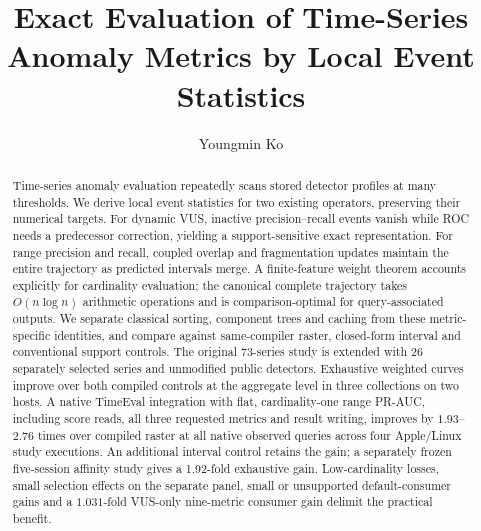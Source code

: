 \documentclass[sigconf,nonacm]{acmart}
\begin{document}
\title{Exact Evaluation of Time-Series Anomaly Metrics by Local Event Statistics}
\author{Youngmin Ko}
\begin{abstract}
Time-series anomaly evaluation repeatedly scans stored detector profiles at many thresholds. We derive local event statistics for two existing operators, preserving their numerical targets. For dynamic VUS, inactive precision--recall events vanish while ROC needs a predecessor correction, yielding a support-sensitive exact representation. For range precision and recall, coupled overlap and fragmentation updates maintain the entire trajectory as predicted intervals merge. A finite-feature weight theorem accounts explicitly for cardinality evaluation; the canonical complete trajectory takes $O(n\log n)$ arithmetic operations and is comparison-optimal for query-associated outputs. We separate classical sorting, component trees and caching from these metric-specific identities, and compare against same-compiler raster, closed-form interval and conventional support controls. The original 73-series study is extended with 26 separately selected series and unmodified public detectors. Exhaustive weighted curves improve over both compiled controls at the aggregate level in three collections on two hosts. A native TimeEval integration with flat, cardinality-one range PR-AUC, including score reads, all three requested metrics and result writing, improves by $1.93$--$2.76$ times over compiled raster at all native observed queries across four Apple/Linux study executions. An additional interval control retains the gain; a separately frozen five-session affinity study gives a 1.92-fold exhaustive gain. Low-cardinality losses, small selection effects on the separate panel, small or unsupported default-consumer gains and a $1.031$-fold VUS-only nine-metric consumer gain delimit the practical benefit.
\end{abstract}
\maketitle
\vldbtopmatter



\end{document}
